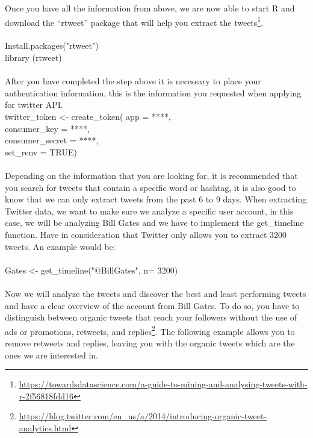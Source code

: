 Once you have all the information from above, we are now able to start R and download the “rtweet” package that will help you extract the tweets\footnote{\href{https://towardsdatascience.com/a-guide-to-mining-and-analysing-tweets-with-r-2f56818fdd16}{https://towardsdatascience.com/a-guide-to-mining-and-analysing-tweets-with-r-2f56818fdd16}}.\\
\\
Install.packages("rtweet")\\ 
library (rtweet)\\
\\
After you have completed the step above it is necessary to place your authentication information, this is the information you requested when applying for twitter API.
\\
twitter\_token <- create\_token(
app = ****,
\\
consumer\_key = ****,
\\
consumer\_secret = ****,
\\
set\_renv = TRUE)\\
\\
Depending on the information that you are looking for, it is recommended that you search for tweets that contain a specific word or hashtag, it is also good to know that we can only extract tweets from the past 6 to 9 days. When extracting Twitter data, we want to make sure we analyze a specific user account, in this case, we will be analyzing Bill Gates and we have to implement the get\_timeline function. Have in consideration that Twitter only allows you to extract 3200 tweets. An example would be:\\
\\
Gates <- get\_timeline("@BillGates", n= 3200)\\
\\
Now we will analyze the tweets and discover the best and least performing tweets and have a clear overview of the account from Bill Gates. To do so, you have to distinguish between organic tweets that reach your followers without the use of ads or promotions, retweets, and replies\footnote{\href{https://blog.twitter.com/en_us/a/2014/introducing-organic-tweet-analytics.html}{https://blog.twitter.com/en\_us/a/2014/introducing-organic-tweet-analytics.html}}. The following example allows you to remove retweets and replies, leaving you with the organic tweets which are the ones we are interested in.


